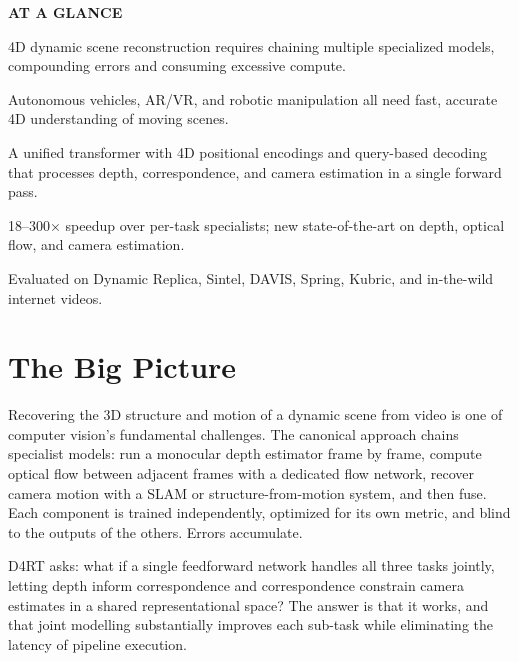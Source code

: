 \documentclass[10pt,twocolumn]{article}
\begin{document}
\begin{mdframed}[backgroundcolor=boxgray,linecolor=rulered,linewidth=1pt,
    innerleftmargin=6pt,innerrightmargin=6pt,
    innertopmargin=6pt,innerbottommargin=6pt]
\textbf{\small AT A GLANCE}\par\vspace{4pt}
\begin{description}[leftmargin=0pt,labelsep=4pt,itemsep=2pt,parsep=0pt,
    font=\small\bfseries]
  \item[Problem:] 4D dynamic scene reconstruction requires chaining multiple
    specialized models, compounding errors and consuming excessive compute.
  \item[Why it matters:] Autonomous vehicles, AR/VR, and robotic manipulation
    all need fast, accurate 4D understanding of moving scenes.
  \item[Method:] A unified transformer with 4D positional encodings and
    query-based decoding that processes depth, correspondence, and camera
    estimation in a single forward pass.
  \item[Result:] 18--300$\times$ speedup over per-task specialists; new
    state-of-the-art on depth, optical flow, and camera estimation.
  \item[Evidence:] Evaluated on Dynamic Replica, Sintel, DAVIS, Spring,
    Kubric, and in-the-wild internet videos.
\end{description}
\end{mdframed}

\section{The Big Picture}

Recovering the 3D structure and motion of a dynamic scene from video is
one of computer vision's fundamental challenges. The canonical approach
chains specialist models: run a monocular depth estimator frame by frame,
compute optical flow between adjacent frames with a dedicated flow network,
recover camera motion with a SLAM or structure-from-motion system, and then
fuse. Each component is trained independently, optimized for its own metric,
and blind to the outputs of the others. Errors accumulate.

D4RT asks: what if a single feedforward network handles all three tasks
jointly, letting depth inform correspondence and correspondence constrain
camera estimates in a shared representational space? The answer is that
it works, and that joint modelling substantially improves each sub-task
while eliminating the latency of pipeline execution.
\end{document}
